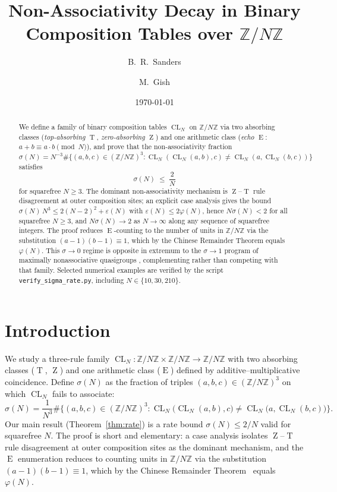 \documentclass[11pt,reqno]{amsart}
\title[Non-associativity decay on \texorpdfstring{$\mathbb{Z}/N\mathbb{Z}$}{Z/NZ}]%
{Non-Associativity Decay in Binary Composition Tables over
$\mathbb{Z}/N\mathbb{Z}$}
\author{B.~R.~Sanders}
\author{M.~Gish}
\date{\today}
\theoremstyle{plain}
\theoremstyle{definition}
\theoremstyle{remark}
\DeclareMathOperator{\CL}{CL}
\DeclareMathOperator{\ECHO}{E}
\DeclareMathOperator{\HARM}{T}
\DeclareMathOperator{\VOID}{Z}
\newcommand{\ZN}{\mathbb{Z}/N\mathbb{Z}}
\begin{document}
\begin{abstract}
We define a family of binary composition tables $\CL_N$ on $\ZN$ via
two absorbing classes (\emph{top-absorbing} $\HARM$, \emph{zero-absorbing}
$\VOID$) and one arithmetic class (\emph{echo} $\ECHO$: $a+b\equiv a\cdot b\pmod N$),
and prove that the non-associativity fraction
$\sigma(N)=N^{-3}\#\{(a,b,c)\in(\ZN)^{3}:\CL_N(\CL_N(a,b),c)\neq\CL_N(a,\CL_N(b,c))\}$
satisfies
\[
  \sigma(N)\;\le\;\frac{2}{N}
\]
for squarefree $N\ge 3$. The dominant non-associativity mechanism is
$\VOID$--$\HARM$ rule disagreement at outer composition sites; an
explicit case analysis gives the bound
$\sigma(N)\,N^{3}\le 2(N-2)^{2}+\varepsilon(N)$ with
$\varepsilon(N)\le 2\varphi(N)$, hence $N\sigma(N)<2$ for all
squarefree $N\ge 3$, and $N\sigma(N)\to 2$ as $N\to\infty$ along
any sequence of squarefree integers. The proof reduces $\ECHO$-counting to
the number of units in $\ZN$ via the substitution
$(a-1)(b-1)\equiv 1$, which by the Chinese Remainder Theorem equals
$\varphi(N)$. This $\sigma\to 0$ regime is opposite in extremum to
the $\sigma\to 1$ program of maximally nonassociative quasigroups
\cite{DrapalWanless2021,DrapalLisonek2020}, complementing rather than
competing with that family. Selected numerical examples
are verified by the script \texttt{verify\_sigma\_rate.py}, including
$N\in\{10,30,210\}$.
\end{abstract}

\maketitle

\section{Introduction}\label{sec:intro}

We study a three-rule family $\CL_N:\ZN\times\ZN\to\ZN$ with two
absorbing classes ($\HARM$, $\VOID$) and one arithmetic class
($\ECHO$) defined by additive--multiplicative coincidence. Define
$\sigma(N)$ as the fraction of triples $(a,b,c)\in(\ZN)^3$ on which
$\CL_N$ fails to associate:
\begin{equation}\label{eq:sigma-def}
  \sigma(N)=\frac{1}{N^{3}}
  \#\Big\{(a,b,c)\in(\ZN)^{3}:
         \CL_N\!\big(\CL_N(a,b),c\big)\neq\CL_N\!\big(a,\CL_N(b,c)\big)\Big\}.
\end{equation}
Our main result (Theorem~\ref{thm:rate}) is a rate bound
$\sigma(N)\le 2/N$ valid for squarefree $N$. The proof is short
and elementary: a case analysis isolates $\VOID$--$\HARM$ rule
disagreement at outer composition sites as the dominant mechanism,
and the $\ECHO$ enumeration reduces to counting units in $\ZN$
via the substitution $(a-1)(b-1)\equiv 1$, which by the Chinese
Remainder Theorem~\cite{Gauss1801,Lang2002} equals $\varphi(N)$.
\end{document}
